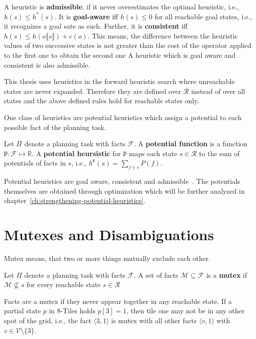 A heuristic is \textbf{admissible}, if it never overestimates the optimal heuristic, i.e., $h(s)\leq h^*(s)$.
It is \textbf{goal-aware} iff $h(s)\leq 0$ for all reachable goal states, i.e., it recognizes a goal sate as such.
Further, it is \textbf{consistent} iff $h(s)\leq h(o\llbracket s\rrbracket)+c(o)$.
This means, the difference between the heuristic values of two successive states is not greater than the cost of the operator applied to the first one to obtain the second one
A heuristic which is goal aware and consistent is also admissible.

This thesis uses heuristics in the forward heuristic search where unreachable states are never expanded.
Therefore they are defined over $\mathcal{R}$ instead of over all states and the above defined rules hold for reachable states only.

One class of heuristics are potential heuristics which assign a potential to each possible fact of the planning task.
\begin{definition}
    Let $\Pi$ denote a planning task with facts $\mathcal{F}$.
    A \textbf{potential function} is a function $\mathtt{P}:\mathcal{F}\mapsto\mathbb{R}$.
    A \textbf{potential heursistic} for $\mathtt{P}$ maps each state $s\in\mathcal{R}$ to the sum of potentials of facts in $s$, i.e., $h^\mathtt{P}(s)=\sum_{f\in s}P(f)$.
\end{definition}

Potential heuristics are goal aware, consistent and admissible~\cite{fivser2020strengthening}.
The potentials themselves are obtained through optimization which will be further analyzed in chapter~\ref{ch:strengthening-potential-heuristics}.

\section{Mutexes and Disambiguations}\label{sec:mutexes-and-disambiguations}
Mutex means, that two or more things mutually exclude each other.

\begin{definition}
    Let $\Pi$ denote a planning task with facts $\mathcal{F}$.
    A set of facts $\mathcal{M}\subseteq \mathcal{F}$ is a \textbf{mutex} if $\mathcal{M}\nsubseteq s$ for every reachable state $s\in\mathcal{R}$
\end{definition}

Facts are a mutex if they never appear together in any reachable state.
If a partial state $p$ in 8-Tiles holds $p[3]=1$, then tile one may not be in any other spot of the grid, i.e., the fact $\langle 3, 1\rangle$ is mutex with all
other facts $\langle v, 1\rangle$ with $v\in \mathcal{V}\setminus \{3\}$.

